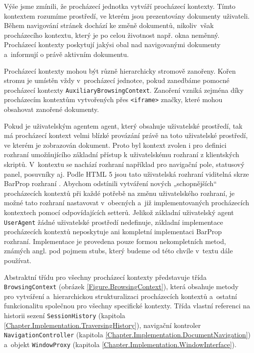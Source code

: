 Výše jsme zmínili, že procházecí jednotka vytváří procházecí kontexty. Tímto kontextem rozumíme prostředí, ve kterém jsou prezentovány dokumenty uživateli. Během navigování stránek dochází ke změně dokumentů, nikoliv~však procházecího kontextu, který je po celou životnost např. okna neměnný. Procházecí kontexty poskytují jakýsi obal nad navigovanými dokumenty a~informují o právě aktivním dokumentu.

Procházecí kontexty mohou být různě hierarchicky stromově zanořeny. Kořen stromu je umístěn vždy v~procházecí jednotce, pokud zanedbáme pomocné procházecí kontexty \texttt{AuxiliaryBrowsingContext}. Zanoření vzniká zejména díky procházecím kontextům vytvořených přes \texttt{<iframe>} značky, které mohou obsahovat zanořené dokumenty.

Pokud je uživatelským agentem agent, který obsahuje uživatelské prostředí, tak má procházecí kontext velmi blízké provázání právě na toto uživatelské prostředí, ve kterém je zobrazován dokument. Proto byl kontext zvolen i pro definici rozhraní umožňujícího základní přístup k uživatelskému rozhraní z klientských skriptů. V~kontextu se nachází rozhraní například pro navigační pole, statusový panel, posuvníky aj. Podle HTML 5 jsou tato uživatelská rozhraní viditelná skrze BarProp rozhraní . Abychom odstínili vytváření nových „schopnějších“ procházecích kontextů při každé potřebě na změnu uživatelského rozhraní, je možné tato rozhraní nastavovat v~obecných a~již implementovaných procházecích kontextech pomocí odpovídajících setterů. Jelikož základní uživatelský agent \texttt{UserAgent} žádné uživatelské prostředí nedefinuje, základní implementace procházecích kontextů neposkytuje ani kompletní implementaci BarProp rozhraní. Implementace je provedena pouze formou nekompletních metod, známých angl. pod pojmem stubs, který budeme od této chvíle v~textu dále používat.

Abstraktní třídu pro všechny procházecí kontexty představuje třída \texttt{BrowsingContext} (obrázek \ref{Figure.BrowsingContext}), která obsahuje metody pro vytváření a~hierarchickou strukturalizaci procházecích kontextů a~ostatní funkcionalitu společnou pro všechny specifické kontexty. Třída vlastní referenci na historii sezení \texttt{SessionHistory} (kapitola \ref{Chapter.Implementation.TraversingHistory}), navigační kontroler \texttt{NavigationController} (kapitola \ref{Chapter.Implementation.DocumentNavigation}) a~objekt \texttt{WindowProxy} (kapitola \ref{Chapter.Implementation.WindowInterface}).

